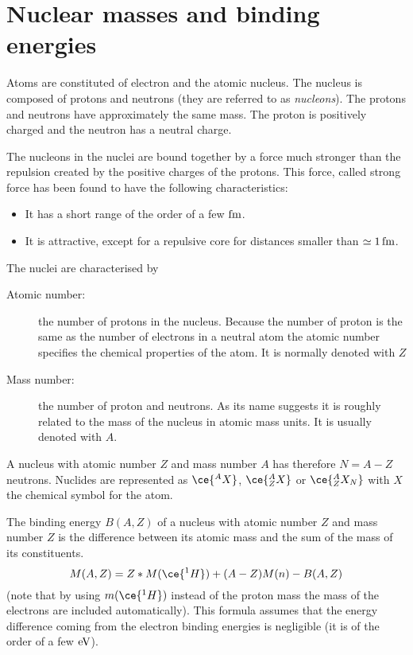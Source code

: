 \section{Nuclear masses and binding energies}
%
%
%
%
%
%
Atoms are constituted of electron and the atomic nucleus. The nucleus is composed of protons and neutrons (they are referred to as \emph{nucleons}). The protons and neutrons have approximately the same mass. The proton is positively charged and the neutron has a neutral charge. 

The nucleons in the nuclei are bound together by a force much stronger than the repulsion created by the positive charges of the protons. This force, called strong force has been found to have the following characteristics: 
\begin{itemize}
\item It has a short range of the order of a few $\rm fm$.
\item It is attractive, except for a repulsive core for distances smaller than $\simeq 1\,\rm fm$. 
\end{itemize}  

The nuclei are characterised by
\begin{description} 
\item[Atomic number:] the number of protons in the nucleus. Because the number of proton is the same as the number of electrons in a neutral atom the atomic number specifies the chemical properties of the atom. It is normally denoted with $Z$   
\item[Mass number:] the number of proton and neutrons. As its name suggests it is roughly related to the mass of the nucleus in atomic mass units. It is usually denoted with $A$.
\end{description}

A nucleus with atomic number $Z$ and mass number $A$ has therefore $N=A-Z$ neutrons. Nuclides are represented as $\ce{^A X}$, $\ce{^{A}_{Z}X}$ or $\ce{^{A}_{Z}X_N}$ with $X$ the chemical symbol for the atom. 

The binding energy $B(A,Z)$ of a nucleus with atomic number $Z$ and mass number $Z$ is the difference between its atomic mass and the sum of the mass of its constituents. 
\[M(A,Z)=Z*M(\ce{^{1}H})+(A-Z)M(n)-B(A,Z)\]
(note that by using $m(\ce{^{1}H})$ instead of the proton mass the mass of the electrons are included automatically). This formula assumes that the energy difference coming from the electron binding energies is negligible (it is of the order of a few $\rm{eV}$). 

